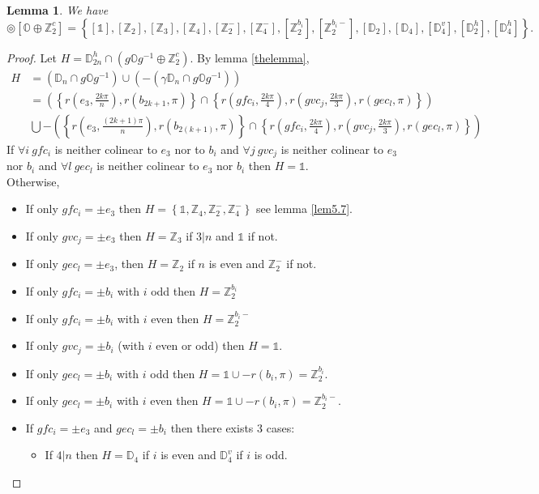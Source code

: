 \documentclass[11pt,a4paper]{amsart}
\newtheorem{lem}[thm]{Lemma}
\theoremstyle{definition}
\newcommand{\ZZ}{\mathbb{Z}}                %
\newcommand{\octa}{\mathbb{O}}              %
\newcommand{\DD}{\mathbb{D}}                %
\newcommand{\1}{\mathds{1}}		            %
\newcommand{\set}[1]{\left\{#1\right\}}     %
\begin{document}
\begin{lem}
We have
\begin{equation*}
[\DD_{2n}^{h}] \circledcirc [\octa \oplus \ZZ_2^c]=\set{[\1],[\ZZ_2],[\ZZ_3],[\ZZ_4],[\ZZ_2^-],[\ZZ_4^-],[\ZZ_{2}^{b_i}],[\ZZ_2^{b_i-}],[\DD_2],[\DD_4],
[\DD_4^v],[\DD_2^h],[\DD_4^h]}.
\end{equation*}
\end{lem}
\begin{proof}
Let $H=\DD_{2n}^h \cap(g\octa g^{-1} \oplus \ZZ_2^c)$.
By lemma \ref{thelemma},
\begin{align*}
H&=(\DD_n\cap g \octa g^{-1})\cup (-(\gamma\DD_n\cap g \octa g^{-1}))\\
&=\left(\set{r(e_3,\frac{2k\pi}{n}),r(b_{2k+1},\pi)}\cap \set{r(gfc_i,\frac{2k\pi}{4}),r(gvc_j,\frac{2k\pi}{3}),r(gec_l,\pi)}\right)\\
&\bigcup-\left(\set{r(e_3,\frac{(2k+1)\pi}{n}),r(b_{2(k+1)},\pi)}\cap \set{r(gfc_i,\frac{2k\pi}{4}),r(gvc_j,\frac{2k\pi}{3}),r(gec_l,\pi)}\right)
\end{align*}
If $\forall i\ gfc_i$ is neither colinear to $e_3$ nor to $b_i$ and $\forall j\ gvc_j$ is neither colinear to $e_3$ nor $b_i$ and $\forall l\ gec_l$ is neither colinear to $e_3$ nor $b_i$ then $H=\1$.\\
Otherwise,
\begin{itemize}
\item If only $gfc_i=\pm e_3$ then $H=\set{\1,\ZZ_4,\ZZ_2^-,\ZZ_4^-}$ see lemma \ref{lem5.7}.
\item If only $gvc_j=\pm e_3$ then $H=\ZZ_3$ if $3|n$ and $\1$ if not.
\item If only $gec_l=\pm e_3$, then $H=\ZZ_2$ if $n$ is even and $\ZZ_2^-$ if not.
\item If only $gfc_i=\pm b_i$ with $i$ odd then $H=\ZZ_2^{b_i}$
\item If only $gfc_i=\pm b_i$ with $i$ even then $H=\ZZ_2^{b_i-}$
\item If only $gvc_j=\pm b_i$ (with $i$ even or odd) then $H=\1$.
\item If only $gec_l=\pm b_i$ with $i$ odd then $H=\1\cup -{r(b_i,\pi)}=\ZZ_2^{b_i}.$
\item If only $gec_l=\pm b_i$ with $i$ even then $H=\1\cup -{r(b_i,\pi)}=\ZZ_2^{b_i-}.$
\item If $gfc_i=\pm e_3$ and $gec_l=\pm b_i$ then there exists 3 cases:
\begin{itemize}
\item If $4|n$ then $H=\DD_4$ if $i$ is even and $\DD_4^v$ if $i$ is odd.\\

\end{itemize}
\end{itemize}
\end{proof}
\end{document}
